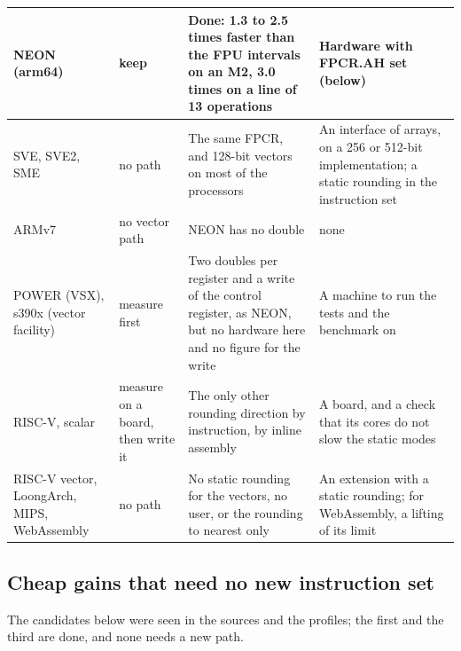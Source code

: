 \begin{longtable}{|L{2.3cm}|L{2.3cm}|L{5.0cm}|L{3.4cm}|}
NEON (arm64) & keep & Done: 1.3 to 2.5 times faster than the FPU intervals on an M2, 3.0 times on a line of 13 operations & Hardware with
FPCR.AH set (below) \\
\hline
SVE, SVE2, SME & no path & The same FPCR, and 128-bit vectors on most of the
processors & An interface of arrays, on a 256 or 512-bit implementation; a
static rounding in the instruction set \\
\hline
ARMv7 & no vector path & NEON has no double & none \\
\hline
POWER (VSX), s390x (vector facility) & measure first & Two doubles per
register and a write of the control register, as NEON, but no hardware here
and no figure for the write & A machine to run the tests and the benchmark
on \\
\hline
RISC-V, scalar & measure on a board, then write it & The only other rounding
direction by instruction, by inline assembly & A board, and a check that its
cores do not slow the static modes \\
\hline
RISC-V vector, LoongArch, MIPS, WebAssembly & no path & No static rounding
for the vectors, no user, or the rounding to nearest only & An extension
with a static rounding; for WebAssembly, a lifting of its limit \\
\hline
\end{longtable}
\endgroup

\subsection{Cheap gains that need no new instruction set}

The candidates below were seen in the sources and the profiles; the first
and the third are done, and none needs a new path.

